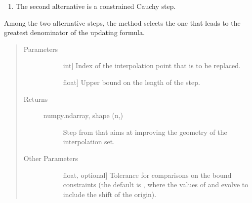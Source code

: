 \documentclass[letterpaper,10pt,english]{sphinxmanual}
\begin{document}
\begin{fulllineitems}
\begin{fulllineitems}
\begin{enumerate}
\item {} 
\sphinxAtStartPar
The second alternative is a constrained Cauchy step.

\end{enumerate}

\sphinxAtStartPar
Among the two alternative steps, the method selects the one that leads
to the greatest denominator of the updating formula.
\begin{quote}\begin{description}
\item[{Parameters}] \leavevmode\begin{description}
\item[{}] \leavevmode{[}int{]}
\sphinxAtStartPar
Index of the interpolation point that is to be replaced.

\item[{}] \leavevmode{[}float{]}
\sphinxAtStartPar
Upper bound on the length of the step.

\end{description}

\item[{Returns}] \leavevmode\begin{description}
\item[{numpy.ndarray, shape (n,)}] \leavevmode
\sphinxAtStartPar
Step from  that aims at improving the geometry of the
interpolation set.

\end{description}

\item[{Other Parameters}] \leavevmode\begin{description}
\item[{}] \leavevmode{[}float, optional{]}
\sphinxAtStartPar
Tolerance for comparisons on the bound constraints (the default is
, where the
values of  and  evolve to include the shift of the
origin).

\end{description}

\end{description}\end{quote}

\end{fulllineitems}




\end{fulllineitems}
\end{document}
